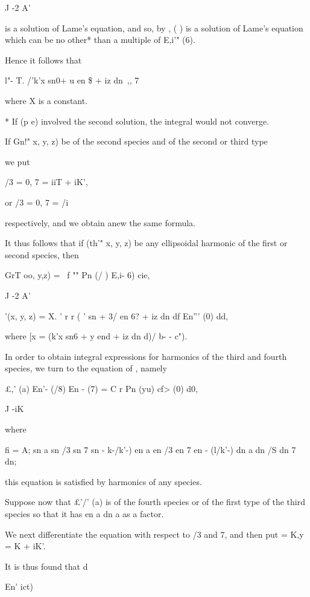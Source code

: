 {{{{{{{{J -2 A'

is a solution of Lame's equation, and so, by , ( ) is a solution
of Lame's equation which can be no other* than a multiple of E,i'"
(6).

Hence it follows that

l"- T. /'k'x sn0+ u en \$ + iz dn \,,, 7

where X is a constant.

* If (p e) involved the second solution, the integral would not
converge.

%
%

If Gn!" x, y, z) be of the second species and of the second or third
type

we put

/3 = 0, 7 = iiT + iK',

or /3 = 0, 7 = /i

respectively, and we obtain anew the same formula.

It thus follows that if (th'" x, y, z) be any ellipsoidal harmonic of
the first or second species, then

GrT oo, y,z) = \ f "" Pn (/ ) E,i- 6) cie,

J -2 A'

  '(x, y, z) = X. ' r r ( ' sn + 3/ en 6? + iz dn df En''' (0) dd,

where [x = (k'x sn6 + y end + iz dn d)/\/ b- - c").


In order to obtain integral expressions for harmonics of the third and
fourth species, we turn to the equation of , namely

£,' (a) En'- (/8) En - (7) = C r Pn (yu) cf> (0) d0,

J -iK

where

fi = A; sn a sn /3 sn 7 sn - k-/k'-) en a en /3 en 7 en - (l/k'-) dn a
dn /S dn 7 dn;

this equation is satisfied by harmonics of any species.

Suppose now that £'/' (a) is of the fourth species or of the first
type of the third species so that it has en a dn a as a factor.

We next differentiate the equation with respect to /3 and 7, and then
put = K,y = K + iK'.

It is thus found that d

En' ict)

}}}}}}}}
